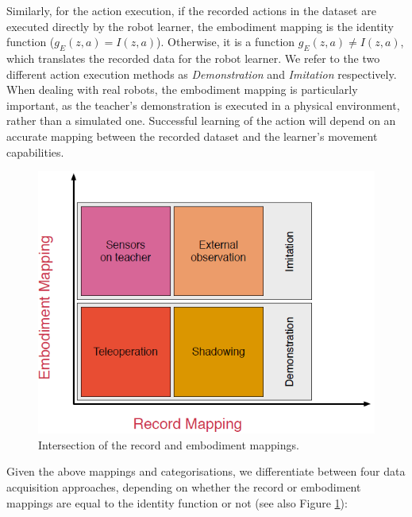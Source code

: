 Similarly, for the action execution, if the recorded actions in the dataset are executed directly by the robot learner, the embodiment mapping is the identity function ($g_E(z,a) = I(z,a)$). Otherwise, it is a function $g_E(z,a) \neq I(z,a)$, which translates the recorded data for the robot learner.  We refer to the two different action execution methods as \textit{Demonstration} and \textit{Imitation} respectively.
When dealing with real robots, the embodiment mapping is particularly important, as the teacher's demonstration is executed in a physical environment, rather than a simulated one. Successful learning of the action will depend on an accurate mapping between the recorded dataset and the learner's movement capabilities.
  \begin{figure}[!h]
    \centering
    \includegraphics[scale=0.5]{figures/Gathering}
    \caption{Intersection of the record and embodiment mappings.}
    \label{fig:Gathering demonstrations}
  \end{figure}

Given the above mappings and categorisations, we differentiate between four data acquisition approaches, depending on whether the record or embodiment mappings are equal to the identity function or not (see also Figure \ref{fig:Gathering demonstrations}):

